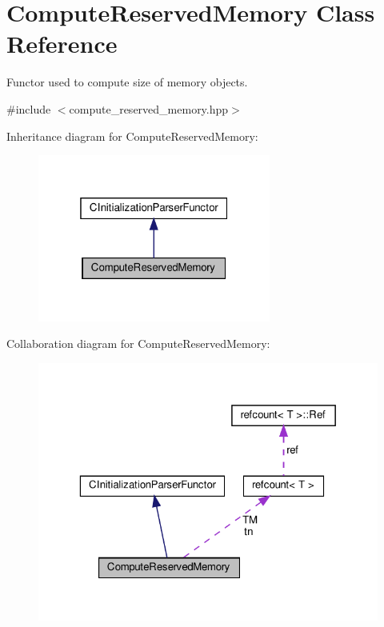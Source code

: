\hypertarget{classComputeReservedMemory}{}\section{Compute\+Reserved\+Memory Class Reference}
\label{classComputeReservedMemory}


Functor used to compute size of memory objects.  




{\ttfamily \#include $<$compute\+\_\+reserved\+\_\+memory.\+hpp$>$}



Inheritance diagram for Compute\+Reserved\+Memory\+:
\nopagebreak
\begin{figure}[H]
\begin{center}
\leavevmode
\includegraphics[width=217pt]{dc/db1/classComputeReservedMemory__inherit__graph}
\end{center}
\end{figure}


Collaboration diagram for Compute\+Reserved\+Memory\+:
\nopagebreak
\begin{figure}[H]
\begin{center}
\leavevmode
\includegraphics[width=323pt]{d0/d41/classComputeReservedMemory__coll__graph}
\end{center}
\end{figure}
